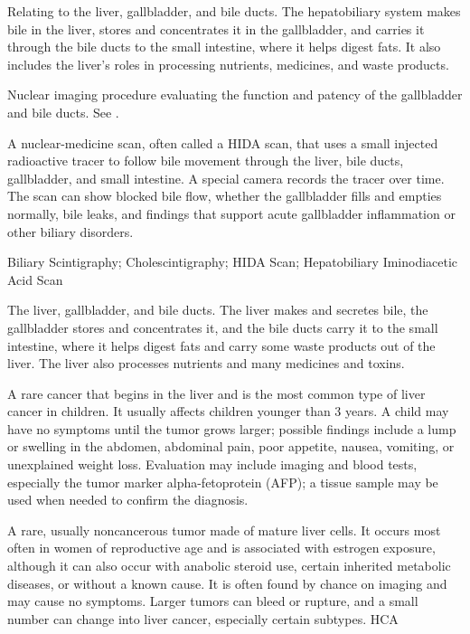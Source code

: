  Relating to the liver, gallbladder, and bile ducts. The hepatobiliary system makes bile in the liver, stores and concentrates it in the gallbladder, and carries it through the bile ducts to the small intestine, where it helps digest fats. It also includes the liver’s roles in processing nutrients, medicines, and waste products.

 Nuclear imaging procedure evaluating the function and patency of the gallbladder and bile ducts. See .

 A nuclear-medicine scan, often called a HIDA scan, that uses a small injected radioactive tracer to follow bile movement through the liver, bile ducts, gallbladder, and small intestine. A special camera records the tracer over time. The scan can show blocked bile flow, whether the gallbladder fills and empties normally, bile leaks, and findings that support acute gallbladder inflammation or other biliary disorders.

\synonyms
Biliary Scintigraphy; Cholescintigraphy; HIDA Scan; Hepatobiliary Iminodiacetic Acid Scan

 The liver, gallbladder, and bile ducts. The liver makes and secretes bile, the gallbladder stores and concentrates it, and the bile ducts carry it to the small intestine, where it helps digest fats and carry some waste products out of the liver. The liver also processes nutrients and many medicines and toxins.

 A rare cancer that begins in the liver and is the most common type of liver cancer in children. It usually affects children younger than 3 years. A child may have no symptoms until the tumor grows larger; possible findings include a lump or swelling in the abdomen, abdominal pain, poor appetite, nausea, vomiting, or unexplained weight loss. Evaluation may include imaging and blood tests, especially the tumor marker alpha-fetoprotein (AFP); a tissue sample may be used when needed to confirm the diagnosis.

 A rare, usually noncancerous tumor made of mature liver cells. It occurs most often in women of reproductive age and is associated with estrogen exposure, although it can also occur with anabolic steroid use, certain inherited metabolic diseases, or without a known cause. It is often found by chance on imaging and may cause no symptoms. Larger tumors can bleed or rupture, and a small number can change into liver cancer, especially certain subtypes.
\synonyms
HCA

